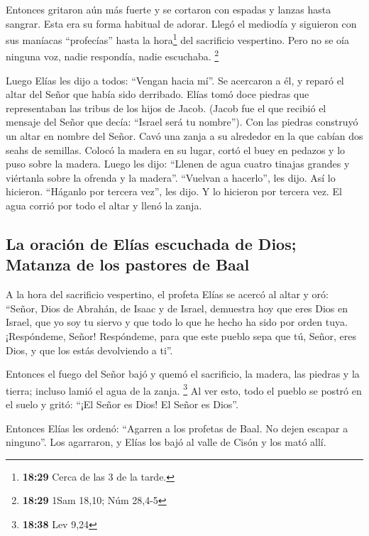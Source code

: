  Entonces gritaron aún más fuerte y se cortaron con
espadas y lanzas hasta sangrar. Esta era su forma habitual de adorar.
 Llegó el mediodía y siguieron con sus maníacas
``profecías'' hasta la hora\footnote{\textbf{18:29} Cerca de las 3 de la
  tarde.} del sacrificio vespertino. Pero no se oía ninguna voz, nadie
respondía, nadie escuchaba. \footnote{\textbf{18:29} 1Sam 18,10; Núm
  28,4-5}

 Luego Elías les dijo a todos: ``Vengan hacia mí''. Se
acercaron a él, y reparó el altar del Señor que había sido derribado.
 Elías tomó doce piedras que representaban las tribus de
los hijos de Jacob. (Jacob fue el que recibió el mensaje del Señor que
decía: ``Israel será tu nombre'').  Con las piedras
construyó un altar en nombre del Señor. Cavó una zanja a su alrededor en
la que cabían dos seahs de semillas.  Colocó la madera en
su lugar, cortó el buey en pedazos y lo puso sobre la madera. Luego les
dijo: ``Llenen de agua cuatro tinajas grandes y viértanla sobre la
ofrenda y la madera''.  ``Vuelvan a hacerlo'', les dijo.
Así lo hicieron. ``Háganlo por tercera vez'', les dijo. Y lo hicieron
por tercera vez.  El agua corrió por todo el altar y
llenó la zanja.

\hypertarget{la-oraciuxf3n-de-eluxedas-escuchada-de-dios-matanza-de-los-pastores-de-baal}{%
\subsection{La oración de Elías escuchada de Dios; Matanza de los
pastores de
Baal}\label{la-oraciuxf3n-de-eluxedas-escuchada-de-dios-matanza-de-los-pastores-de-baal}}

 A la hora del sacrificio vespertino, el profeta Elías se
acercó al altar y oró: ``Señor, Dios de Abrahán, de Isaac y de Israel,
demuestra hoy que eres Dios en Israel, que yo soy tu siervo y que todo
lo que he hecho ha sido por orden tuya.  ¡Respóndeme,
Señor! Respóndeme, para que este pueblo sepa que tú, Señor, eres Dios, y
que los estás devolviendo a ti''.

 Entonces el fuego del Señor bajó y quemó el sacrificio,
la madera, las piedras y la tierra; incluso lamió el agua de la zanja.
\footnote{\textbf{18:38} Lev 9,24}  Al ver esto, todo el
pueblo se postró en el suelo y gritó: ``¡El Señor es Dios! El Señor es
Dios''.

 Entonces Elías les ordenó: ``Agarren a los profetas de
Baal. No dejen escapar a ninguno''. Los agarraron, y Elías los bajó al
valle de Cisón y los mató allí.

